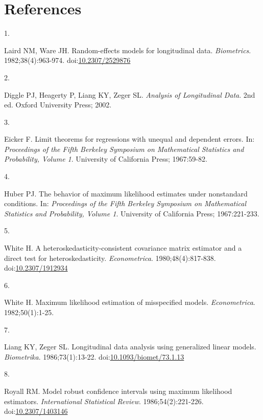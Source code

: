 \documentclass[
  11pt,
]{article}
\newlength{\cslhangindent}
\newlength{\csllabelwidth}
\newenvironment{CSLReferences}[2] %
 {\begin{list}{}{%
  \setlength{\itemindent}{0pt}
  \setlength{\leftmargin}{0pt}
  \setlength{\parsep}{0pt}
  \ifodd #1
   \setlength{\leftmargin}{\cslhangindent}
   \setlength{\itemindent}{-1\cslhangindent}
  \fi
  \setlength{\itemsep}{#2\baselineskip}}}
 {\end{list}}
\newcommand{\CSLLeftMargin}[1]{\parbox[t]{\csllabelwidth}{\strut#1\strut}}
\newcommand{\CSLRightInline}[1]{\parbox[t]{\linewidth - \csllabelwidth}{\strut#1\strut}}
\begin{document}
\section{References}\label{references}

\protect{}\label{refs}
\begin{CSLReferences}{0}{1}
\CSLLeftMargin{1. }%
\CSLRightInline{Laird NM, Ware JH. Random-effects models for longitudinal data. \emph{Biometrics}. 1982;38(4):963-974. doi:\href{https://doi.org/10.2307/2529876}{10.2307/2529876}}

\CSLLeftMargin{2. }%
\CSLRightInline{Diggle PJ, Heagerty P, Liang KY, Zeger SL. \emph{Analysis of Longitudinal Data}. 2nd ed. Oxford University Press; 2002.}

\CSLLeftMargin{3. }%
\CSLRightInline{Eicker F. Limit theorems for regressions with unequal and dependent errors. In: \emph{Proceedings of the Fifth {Berkeley} Symposium on Mathematical Statistics and Probability, Volume 1}. University of California Press; 1967:59-82.}

\CSLLeftMargin{4. }%
\CSLRightInline{Huber PJ. The behavior of maximum likelihood estimates under nonstandard conditions. In: \emph{Proceedings of the Fifth {Berkeley} Symposium on Mathematical Statistics and Probability, Volume 1}. University of California Press; 1967:221-233.}

\CSLLeftMargin{5. }%
\CSLRightInline{White H. A heteroskedasticity-consistent covariance matrix estimator and a direct test for heteroskedasticity. \emph{Econometrica}. 1980;48(4):817-838. doi:\href{https://doi.org/10.2307/1912934}{10.2307/1912934}}

\CSLLeftMargin{6. }%
\CSLRightInline{White H. Maximum likelihood estimation of misspecified models. \emph{Econometrica}. 1982;50(1):1-25.}

\CSLLeftMargin{7. }%
\CSLRightInline{Liang KY, Zeger SL. Longitudinal data analysis using generalized linear models. \emph{Biometrika}. 1986;73(1):13-22. doi:\href{https://doi.org/10.1093/biomet/73.1.13}{10.1093/biomet/73.1.13}}

\CSLLeftMargin{8. }%
\CSLRightInline{Royall RM. Model robust confidence intervals using maximum likelihood estimators. \emph{International Statistical Review}. 1986;54(2):221-226. doi:\href{https://doi.org/10.2307/1403146}{10.2307/1403146}}


\end{CSLReferences}
\end{document}
